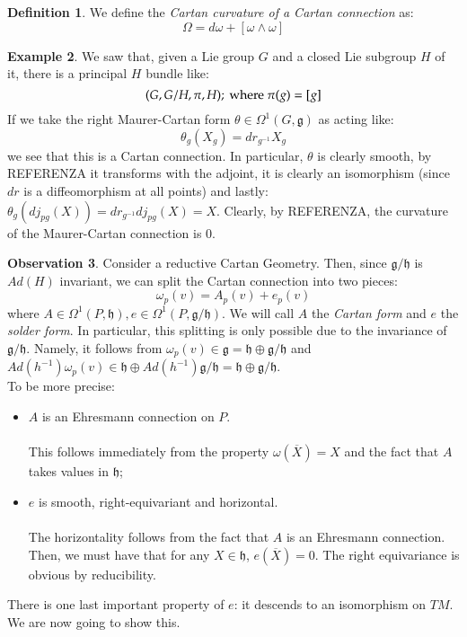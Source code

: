 \documentclass[12pt,a4paper]{report}
\theoremstyle{definition}
\newtheorem{Def}{Definition}[chapter]
\theoremstyle{Theorem}
\theoremstyle{break}
\newtheorem{Ex}[Def]{Example}
\theoremstyle{definition}
\newtheorem{Obs}[Def]{Observation}
\begin{document}
		\begin{Def}
			We define the \textit{Cartan curvature of a Cartan connection} as:
			$$\Omega=d\omega+[\omega\wedge \omega]$$
		\end{Def}
		\begin{Ex}
			We saw that, given a Lie group $G$ and a closed Lie subgroup $H$ of it, there is a principal $H$ bundle like:
			$$(G,G/H,\pi,H); \hbox{ where }\pi(g)=[g]$$
			If we take the right Maurer-Cartan form $\theta\in\Omega^1(G,\mathfrak{g})$ as acting like:
			$$\theta_g(X_g)=dr_{g^{-1}}X_g$$
			we see that this is a Cartan connection. In particular, $\theta$ is clearly smooth, by REFERENZA it transforms with the adjoint, it is clearly an isomorphism (since $dr$ is a diffeomorphism at all points) and lastly:
			$\theta_g(dj_{pg}(X))=dr_{g^{-1}}dj_{pg}(X)=X$. Clearly, by REFERENZA, the curvature of the Maurer-Cartan connection is 0.
		\end{Ex}
	\begin{Obs}
		Consider a reductive Cartan Geometry. Then, since $\mathfrak{g/h}$ is $Ad(H)$ invariant, we can split the Cartan connection into two pieces:
		$$\omega_p(v)=A_p(v)+e_p(v)$$
		where $A\in\Omega^1(P,\mathfrak{h}),e\in\Omega^1(P,\mathfrak{g/h})$. We will call $A$ the \textit{Cartan form} and $e$ the \textit{solder form}. In particular, this splitting is only possible due to the invariance of $\mathfrak{g/h}$. Namely, it follows from $\omega_p(v)\in\mathfrak{g}=\mathfrak{h}\oplus\mathfrak{g/h}$ and $Ad(h^{-1})\omega_p(v)\in \mathfrak{h}\oplus Ad(h^{-1})\mathfrak{g/h}=\mathfrak{h}\oplus \mathfrak{g/h}$.\\ 
		To be more precise:
		\begin{itemize}
			\item $A$ is an Ehresmann connection on $P$.\\
			\\
			This follows immediately from the property $\omega(\overline{X})=X$ and the fact that $A$ takes values in $\mathfrak{h}$;
			\item $e$ is smooth, right-equivariant and horizontal.\\
			\\
			The horizontality follows from the fact that $A$ is an Ehresmann connection. Then, we must have that for any $X\in\mathfrak{h}$, $e(\overline{X})=0$. The right equivariance is obvious by reducibility.
		\end{itemize}
		There is one last important property of $e$: it descends to an isomorphism on $TM$. We are now going to show this.
	\end{Obs}
\end{document}
